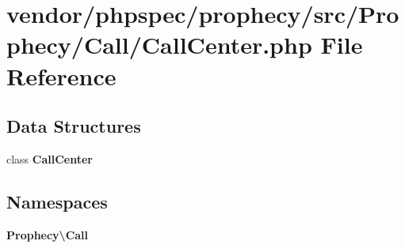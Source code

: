 \section{vendor/phpspec/prophecy/src/\+Prophecy/\+Call/\+Call\+Center.php File Reference}
\label{_call_center_8php}
\subsection*{Data Structures}
\begin{DoxyCompactItemize}
\item 
class {\bf Call\+Center}
\end{DoxyCompactItemize}
\subsection*{Namespaces}
\begin{DoxyCompactItemize}
\item 
 {\bf Prophecy\textbackslash{}\+Call}
\end{DoxyCompactItemize}
